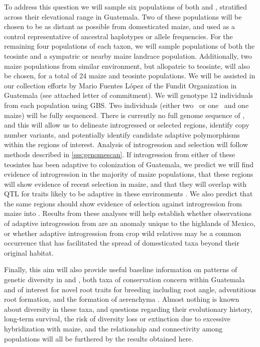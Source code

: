 To address this question we will sample six populations of both \zl{} and \zh{}, stratified across their elevational range in Guatemala.  
Two of these populations will be chosen to be as distant as possible from domesticated maize, and used as a control representative of ancestral haplotypes or allele frequencies.  
For the remaining four populations of each taxon, we will sample populations of both the teosinte and a sympatric or nearby maize landrace population.
Additionally, two maize populations from similar environment, but allopatric to teosinte, will also be chosen, for a total of 24 maize and teosinte populations.
We will be assisted in our collection efforts by Mario Fuentes L\'{o}pez of the Fundit Organization in Guatemala (see attached letter of commitment).
We will genotype 12 individuals from each population using GBS. 
Two individuals (either two \zl\ or one \zl\ and one maize) will be fully sequenced.
There is currently no full genome sequence of \zl, and this will allow us to delineate introgressed or selected regions, identify copy number variants, and potentially identify candidate adaptive polymorphisms within the regions of interest.
Analysis of introgression and selection will follow methods described in \ref{sss:genomescan}.
If introgression from either of these teosintes has been adaptive to colonization of Guatemala, we predict we will find evidence of introgression in the majority of maize populations, that these regions will show evidence of recent selection in maize, and that they will overlap with QTL for traits likely to be adaptive in these environments \citep[e.g.][]{omori2007qtl,mano2008linkage}.
We also predict that the same regions should show evidence of selection against introgression from maize into \zl.
Results from these analyses will help establish whether observations of adaptive introgression from \zm{} are an anomaly unique to the highlands of Mexico, or whether adaptive introgression from crop wild relatives may be a common occurrence that has facilitated the spread of domesticated taxa beyond their original habitat.

Finally, this aim will also provide useful baseline information on patterns of genetic diversity in \zl{} and \zh, both taxa of conservation concern within Guatemala and of interest for novel root traits for breeding including root angle, adventitious root formation, and the formation of aerenchyma \citep{omori2007qtl,mano2007breeding}. 
Almost nothing is known about diversity in these taxa, and questions regarding their evolutionary history, long-term survival, the risk of diversity loss or extinction due to excessive hybridization with maize, and the relationship and connectivity among populations will all be furthered by the results obtained here.

